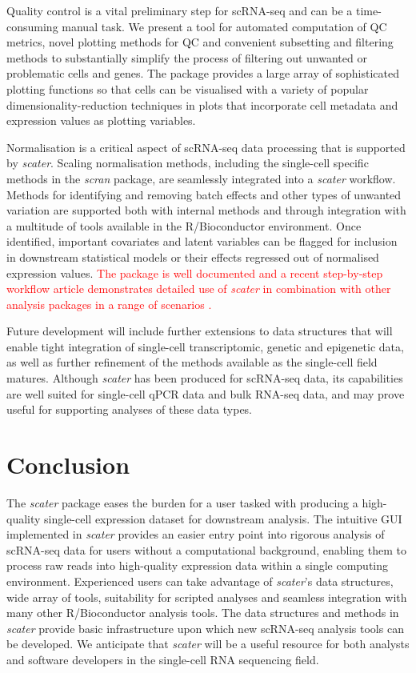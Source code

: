 \documentclass{bioinfo}
\newcommand{\revised}[1]{\textcolor{red}{#1}}
\begin{document}
Quality control is a vital preliminary step for scRNA-seq and can be a
time-consuming manual task. We present a tool for automated computation
of QC metrics, novel plotting methods for QC and convenient subsetting
and filtering methods to substantially simplify the process of filtering
out unwanted or problematic cells and genes. The package provides a
large array of sophisticated plotting functions so that cells can be
visualised with a variety of popular dimensionality-reduction techniques
in plots that incorporate cell metadata and expression values as
plotting variables.

Normalisation is a critical aspect of scRNA-seq data processing that is supported by \emph{scater}. Scaling normalisation methods, including the single-cell specific methods in the \emph{scran} package, are seamlessly integrated into a \emph{scater} workflow. Methods for identifying and removing batch effects and other types of unwanted variation are supported both with internal methods and through integration with a multitude of tools available in the R/Bioconductor environment. Once identified, important covariates and latent variables can be flagged for inclusion in downstream statistical models or their effects regressed out of normalised expression values. \revised{The package is well documented and a recent step-by-step workflow article demonstrates detailed use of \emph{scater} in combination with other analysis packages in a range of scenarios \citep{Lun2016-uj}.}

Future development will include further extensions to data structures that will enable tight integration of single-cell transcriptomic, genetic and epigenetic data, as well as further refinement of the methods available as the single-cell field matures. Although \emph{scater} has been produced for
scRNA-seq data, its capabilities are well suited for single-cell qPCR data
and bulk RNA-seq data, and may prove useful for supporting analyses of these data types.


\section{Conclusion}\label{conclusion}

The \emph{scater} package eases the burden for a user tasked with
producing a high-quality single-cell expression dataset for downstream analysis. The intuitive GUI implemented in \emph{scater} provides an easier entry point into rigorous analysis of scRNA-seq data for users without a
computational background, enabling them to process raw reads into high-quality expression data within a single computing environment. Experienced users can take advantage of \emph{scater}'s data structures, wide array of tools, suitability for scripted analyses and seamless integration with many other R/Bioconductor analysis tools. The data structures and methods in
\emph{scater} provide basic infrastructure upon which new scRNA-seq
analysis tools can be developed. We anticipate that \emph{scater} will be a
useful resource for both analysts and software developers in the
single-cell RNA sequencing field.\vspace*{-10pt}
\end{document}
